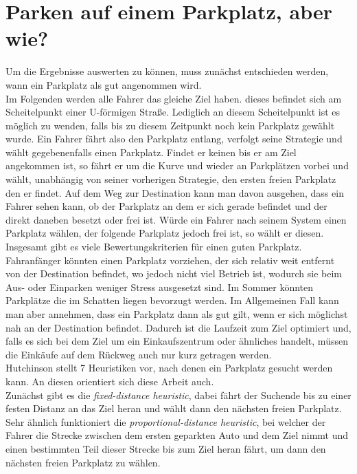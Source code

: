 \section{Parken auf einem Parkplatz, aber wie?}

Um die Ergebnisse auswerten zu können, muss zunächst entschieden werden, wann ein Parkplatz als gut angenommen wird.\\
Im Folgenden werden alle Fahrer das gleiche Ziel haben. dieses befindet sich am Scheitelpunkt einer U-förmigen Straße. Lediglich an diesem Scheitelpunkt ist es möglich zu wenden, falls bis zu diesem Zeitpunkt noch kein Parkplatz gewählt wurde. Ein Fahrer fährt also den Parkplatz entlang, verfolgt seine Strategie und wählt gegebenenfalls einen Parkplatz. Findet er keinen bis er am Ziel angekommen ist, so fährt er um die Kurve und wieder an Parkplätzen vorbei und wählt, unabhängig von seiner vorherigen Strategie, den ersten freien Parkplatz den er findet. Auf dem Weg zur Destination kann man davon ausgehen, dass ein Fahrer sehen kann, ob der Parkplatz an dem er sich gerade befindet und der direkt daneben besetzt oder frei ist. Würde ein Fahrer nach seinem System einen Parkplatz wählen, der folgende Parkplatz jedoch frei ist, so wählt er diesen.\\
Insgesamt gibt es viele Bewertungskriterien für einen guten Parkplatz. Fahranfänger könnten einen Parkplatz vorziehen, der sich relativ weit entfernt von der Destination befindet, wo jedoch nicht viel Betrieb ist, wodurch sie beim Aus- oder Einparken weniger Stress ausgesetzt sind. Im Sommer könnten Parkplätze die im Schatten liegen bevorzugt werden. Im Allgemeinen Fall kann man aber annehmen, dass ein Parkplatz dann als gut gilt, wenn er sich möglichst nah an der Destination befindet. Dadurch ist die Laufzeit zum Ziel optimiert und, falls es sich bei dem Ziel um ein Einkaufszentrum oder ähnliches handelt, müssen die Einkäufe auf dem Rückweg auch nur kurz getragen werden.\\
Hutchinson stellt 7 Heuristiken vor, nach denen ein Parkplatz gesucht werden kann. An diesen orientiert sich diese Arbeit auch. \\
Zunächst gibt es die \emph{fixed-distance heuristic}, dabei fährt der Suchende bis zu einer festen Distanz an das Ziel heran und wählt dann den nächsten freien Parkplatz. Sehr ähnlich funktioniert die \emph{proportional-distance heuristic}, bei welcher der Fahrer die Strecke zwischen dem ersten geparkten Auto und dem Ziel nimmt und einen bestimmten Teil dieser Strecke bis zum Ziel heran fährt, um dann den nächsten freien Parkplatz zu wählen.\\
